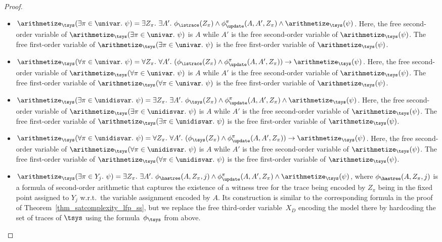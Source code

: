 \begin{proof}
\begin{itemize}
    \item $\arithmetize_\tsys(\exists\pi\in \univar.\ \psi) = \exists Z_\pi.\  \exists A'.\ \phi_{\istrace}(Z_\pi) \wedge \phi_\update^\pi(A,A',Z_\pi) \wedge \arithmetize_\tsys(\psi)$. 
    Here, the free second-order variable of $\arithmetize_\tsys(\exists\pi\in \univar.\ \psi)$ is $A$ while $A'$ is the free second-order variable of $\arithmetize_\tsys(\psi)$. The free first-order variable of $\arithmetize_\tsys(\exists\pi\in \univar.\ \psi)$ is the free first-order variable of $\arithmetize_\tsys(\psi)$.
    
    \item $\arithmetize_\tsys(\forall\pi\in \univar.\ \psi) = \forall Z_\pi.\ \forall A'.\ (\phi_{\istrace}(Z_\pi) \wedge \phi_\update^\pi(A,A',Z_\pi) )\rightarrow \arithmetize_\tsys(\psi)$. 
    Here, the free second-order variable of $\arithmetize_\tsys(\forall\pi\in \univar.\ \psi)$ is $A$ while $A'$ is the free second-order variable of $\arithmetize_\tsys(\psi)$. The free first-order variable of $\arithmetize_\tsys(\forall\pi\in \univar.\ \psi)$ is the free first-order variable of $\arithmetize_\tsys(\psi)$.

    \item $\arithmetize_\tsys(\exists\pi\in \unidisvar.\ \psi) = \exists Z_\pi.\  \exists A'.\ \phi_\tsys(Z_\pi) \wedge \phi_\update^\pi(A,A',Z_\pi) \wedge \arithmetize_\tsys(\psi)$. 
    Here, the free second-order variable of $\arithmetize_\tsys(\exists\pi\in \unidisvar.\ \psi)$ is $A$ while $A'$ is the free second-order variable of $\arithmetize_\tsys(\psi)$. The free first-order variable of $\arithmetize_\tsys(\exists\pi\in \unidisvar.\ \psi)$ is the free first-order variable of $\arithmetize_\tsys(\psi)$.
    
    \item $\arithmetize_\tsys(\forall\pi\in \unidisvar.\ \psi) = \forall Z_\pi.\ \forall A'.\ (\phi_\tsys(Z_\pi) \wedge \phi_\update^\pi(A,A',Z_\pi) )\rightarrow \arithmetize_\tsys(\psi)$. 
    Here, the free second-order variable of $\arithmetize_\tsys(\forall\pi\in \unidisvar.\ \psi)$ is $A$ while $A'$ is the free second-order variable of $\arithmetize_\tsys(\psi)$. The free first-order variable of $\arithmetize_\tsys(\forall\pi\in \unidisvar.\ \psi)$ is the free first-order variable of $\arithmetize_\tsys(\psi)$.


    \item $\arithmetize_\tsys(\exists\pi\in Y_j.\ \psi) = \exists Z_\pi.\ \exists A'.\ \phi_\hastree(A,Z_\pi,j) \wedge \phi_\update^\pi(A,A',Z_\pi) \wedge \arithmetize_\tsys(\psi)$, where $\phi_\hastree(A,Z_\pi,j)$ is a formula of second-order arithmetic that captures the existence of a witness tree for the trace being encoded by $Z_\pi$ being in the fixed point assigned to $Y_j$ w.r.t.\ the variable assignment encoded by $A$. Its construction is similar to the corresponding formula in the proof of Theorem~\ref{thm_satcomplexity_lfp_ss}, but we replace the free third-order variable~$X_D$ encoding the model there by hardcoding the set of traces of $\tsys$ using the formula~$\phi_\tsys$ from above.
   

\end{itemize}
\end{proof}
